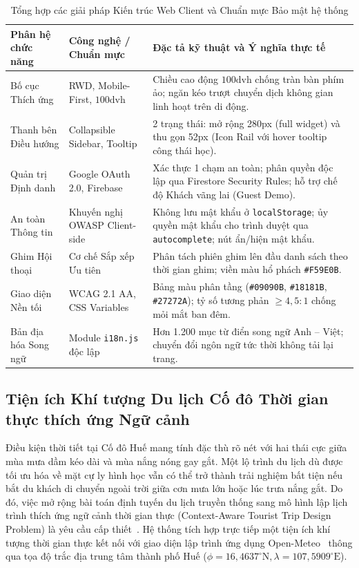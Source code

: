\begin{table}[htbp]
\centering
\caption{Tổng hợp các giải pháp Kiến trúc Web Client và Chuẩn mực Bảo mật hệ thống}
\label{tab:web-security-architecture}
\small
\singlespacing
\renewcommand{\arraystretch}{1.05}
\begin{tabularx}{\textwidth}{l l X}
\hline
\textbf{Phân hệ chức năng} & \textbf{Công nghệ / Chuẩn mực} & \textbf{Đặc tả kỹ thuật và Ý nghĩa thực tế} \\
\hline
Bố cục Thích ứng & RWD, Mobile-First, $100\text{dvh}$ & Chiều cao động $100\text{dvh}$ chống tràn bàn phím ảo; ngăn kéo trượt chuyển dịch không gian linh hoạt trên di động. \\
Thanh bên Điều hướng & Collapsible Sidebar, Tooltip & 2 trạng thái: mở rộng 280px (full widget) và thu gọn 52px (Icon Rail với hover tooltip công thái học). \\
Quản trị Định danh & Google OAuth 2.0, Firebase & Xác thực 1 chạm an toàn; phân quyền độc lập qua Firestore Security Rules; hỗ trợ chế độ Khách vãng lai (Guest Demo). \\
An toàn Thông tin & Khuyến nghị OWASP Client-side & Không lưu mật khẩu ở \texttt{localStorage}; ủy quyền mật khẩu cho trình duyệt qua \texttt{autocomplete}; nút ẩn/hiện mật khẩu. \\
Ghim Hội thoại & Cơ chế Sắp xếp Ưu tiên & Phân tách phiên ghim lên đầu danh sách theo thời gian ghim; viền màu hổ phách \texttt{\#F59E0B}. \\
Giao diện Nền tối & WCAG 2.1 AA, CSS Variables & Bảng màu phân tầng (\texttt{\#09090B}, \texttt{\#18181B}, \texttt{\#27272A}); tỷ số tương phản $\ge 4{,}5:1$ chống mỏi mắt ban đêm. \\
Bản địa hóa Song ngữ & Module \texttt{i18n.js} độc lập & Hơn 1.200 mục từ điển song ngữ Anh -- Việt; chuyển đổi ngôn ngữ tức thời không tải lại trang. \\
\hline
\end{tabularx}
\end{table}

\subsection{Tiện ích Khí tượng Du lịch Cố đô Thời gian thực thích ứng Ngữ cảnh}
\label{subsec:ch1-weather}

Điều kiện thời tiết tại Cố đô Huế mang tính đặc thù rõ nét với hai thái cực giữa mùa mưa dầm kéo dài và mùa nắng nóng gay gắt. Một lộ trình du lịch dù được tối ưu hóa về mặt cự ly hình học vẫn có thể trở thành trải nghiệm bất tiện nếu bắt du khách di chuyển ngoài trời giữa cơn mưa lớn hoặc lúc trưa nắng gắt. Do đó, việc mở rộng bài toán định tuyến du lịch truyền thống sang mô hình lập lịch trình thích ứng ngữ cảnh thời gian thực (Context-Aware Tourist Trip Design Problem) là yêu cầu cấp thiết~\cite{gavalas2014context}. Hệ thống tích hợp trực tiếp một tiện ích khí tượng thời gian thực kết nối với giao diện lập trình ứng dụng Open-Meteo~\cite{zippenfenig2023openmeteo} thông qua tọa độ trắc địa trung tâm thành phố Huế ($\phi = 16{,}4637^\circ\text{N}, \lambda = 107{,}5909^\circ\text{E}$).


